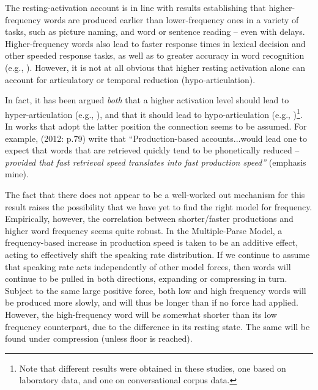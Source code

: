 The resting-activation account is in line with results establishing
that higher-frequency words are produced earlier than lower-frequency
ones in a variety of tasks, such as picture naming, and word or sentence
reading – even with delays. Higher-frequency words also lead to faster
response times in lexical decision and other speeded response tasks,
as well as to greater accuracy in word recognition (e.g., \citealt{howes1951visual,balota1985locus,Luce1986,Marslen-Wilson1990}).
However, it is not at all obvious that higher resting activation alone
can account for articulatory or temporal reduction (hypo-articulation).

In fact, it has been argued \emph{both} that a higher activation level
should lead to hyper-articulation (e.g., \citealt{Baese-Berk2009}),
and that it should lead to hypo-articulation (e.g., \citealt{gahl2012reduce})\footnote{Note that different results were obtained in these studies, one based
on laboratory data, and one on conversational corpus data.}. In works that adopt the latter position the connection seems to
be assumed. For example, \citeauthor{gahl2012reduce}(2012: p.79)
write that “Production-based accounts...would lead one to expect
that words that are retrieved quickly tend to be phonetically reduced
– \emph{provided that fast retrieval speed translates into fast production
speed”} (emphasis mine).

The fact that there does not appear to be a well-worked out mechanism
for this result raises the possibility that we have yet to find the
right model for frequency. Empirically, however, the correlation between
shorter/faster productions and higher word frequency seems quite robust.
In the Multiple-Parse Model, a frequency-based increase in production
speed is taken to be an additive effect, acting to effectively shift
the speaking rate distribution. If we continue to assume that speaking
rate acts independently of other model forces, then words will continue
to be pulled in both directions, expanding or compressing in turn.
Subject to the same large positive force, both low and high frequency
words will be produced more slowly, and will thus be longer than if
no force had applied. However, the high-frequency word will be somewhat
shorter than its low frequency counterpart, due to the difference
in its resting state. The same will be found under compression (unless
floor is reached).

